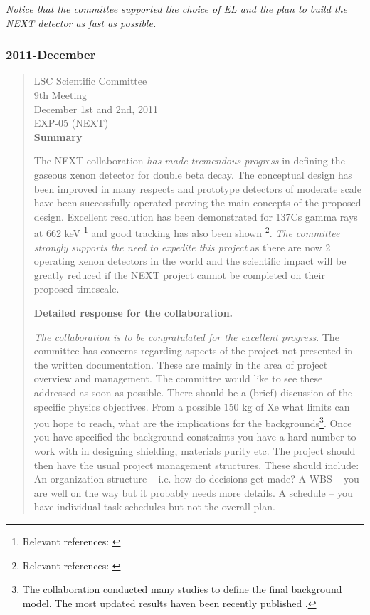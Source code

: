 {\em Notice that the committee supported the choice of EL and the plan to build the NEXT detector as fast as possible.}

\subsubsection*{2011-December}
\begin{quotation}
LSC Scientific Committee\\
9th Meeting\\
December 1st and 2nd, 2011\\
EXP-05 (NEXT)\\

{\bf Summary}

The NEXT collaboration {\em has made tremendous progress} in defining the gaseous xenon detector for double beta decay. The conceptual design has been improved in many respects and prototype detectors of moderate scale have been successfully operated proving the main concepts of the proposed design. Excellent resolution has been demonstrated for 137Cs gamma rays at 662 keV \footnote{Relevant references: \cite{Alvarez:2012yxw, Alvarez:2012zsz,Alvarez:2012hu,Alvarez:2013gxa,Lorca:2014sram}} and good tracking has also been shown \footnote{Relevant references:  \cite{Ferrario:2015kta}}. {\em The committee strongly supports the need to expedite this project} as there are now 2 operating xenon detectors in the world and the scientific impact will be greatly reduced if the NEXT project cannot be completed on their proposed timescale.

{\bf Detailed response for the collaboration.}

{\em The collaboration is to be congratulated for the excellent progress}. The committee has concerns regarding aspects of the project not presented in the written documentation. These are mainly in the area of project overview and management. The committee would like to see these addressed as soon as possible. 
There should be a (brief) discussion of the specific physics objectives. From a possible 150 kg of Xe what limits can you hope to reach, what are the implications for the backgrounds\footnote{The collaboration conducted many studies to define the final background model. The most updated results haven been recently published \cite{Martin-Albo:2015rhw}.}. Once you have specified the background constraints you have a hard number to work with in designing shielding, materials purity etc. The project should then have the usual project management structures. These should include:
An organization structure – i.e. how do decisions get made?
A WBS – you are well on the way but it probably needs more details.
A schedule – you have individual task schedules but not the overall plan. 


\end{quotation}
